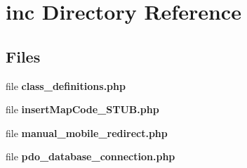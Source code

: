 \section{inc Directory Reference}
\label{dir_bfccd401955b95cf8c75461437045ac0}
\subsection*{Files}
\begin{DoxyCompactItemize}
\item 
file {\bf class\+\_\+definitions.\+php}
\item 
file {\bf insert\+Map\+Code\+\_\+\+S\+T\+U\+B.\+php}
\item 
file {\bf manual\+\_\+mobile\+\_\+redirect.\+php}
\item 
file {\bf pdo\+\_\+database\+\_\+connection.\+php}
\end{DoxyCompactItemize}
